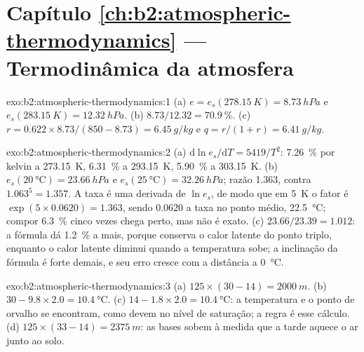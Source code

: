 \section*{Capítulo \ref{ch:b2:atmospheric-thermodynamics} --- Termodinâmica da atmosfera}

\begin{solution}{exo:b2:atmospheric-thermodynamics:1}
(a) $e = e_s(\qty{278.15}{K}) = \qty{8.73}{hPa}$ e $e_s(\qty{283.15}{K}) = \qty{12.32}{hPa}$.
(b) $8.73/12.32 = \qty{70.9}{\percent}$. (c) $r = 0.622 \times 8.73/(850 - 8.73) =
\qty{6.45}{g/kg}$ e $q = r/(1 + r) = \qty{6.41}{g/kg}$.
\end{solution}

\begin{solution}{exo:b2:atmospheric-thermodynamics:2}
(a) $\mathrm{d}\ln e_s/\mathrm{d}T = 5419/T^2$: \qty{7.26}{\percent} por kelvin a
\qty{273.15}{K}, \qty{6.31}{\percent} a \qty{293.15}{K}, \qty{5.90}{\percent} a
\qty{303.15}{K}. (b) $e_s(\qty{20}{\celsius}) = \qty{23.66}{hPa}$ e $e_s(\qty{25}{\celsius})
= \qty{32.26}{hPa}$; razão 1.363, contra $1.063^5 = 1.357$. A taxa é uma derivada de
$\ln e_s$, de modo que em \qty{5}{K} o fator é $\exp(5 \times 0.0620) = 1.363$, sendo 0.0620 a
taxa no ponto médio, \qty{22.5}{\celsius}; compor \qty{6.3}{\percent} cinco vezes chega perto,
mas não é exato. (c) $23.66/23.39 = 1.012$: a fórmula dá \qty{1.2}{\percent} a mais, porque
conserva o calor latente do ponto triplo, enquanto o calor latente diminui quando a temperatura
sobe; a inclinação da fórmula é forte demais, e seu erro cresce com a distância a
\qty{0}{\celsius}.
\end{solution}

\begin{solution}{exo:b2:atmospheric-thermodynamics:3}
(a) $125 \times (30 - 14) = \qty{2000}{m}$. (b) $30 - 9.8 \times 2.0 = \qty{10.4}{\celsius}$.
(c) $14 - 1.8 \times 2.0 = \qty{10.4}{\celsius}$: a temperatura e o ponto de orvalho se encontram, como devem no
nível de saturação; a regra é esse cálculo. (d) $125 \times (33 - 14) = \qty{2375}{m}$:
as bases sobem à medida que a tarde aquece o ar junto ao solo.
\end{solution}

